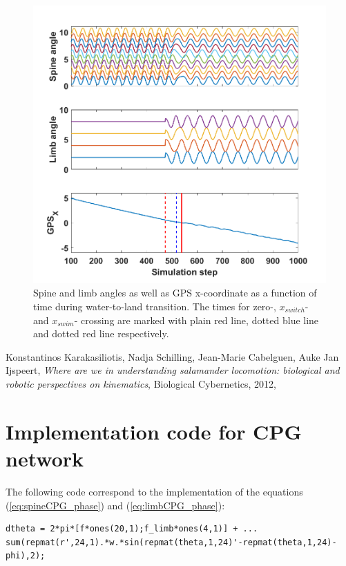 \documentclass[a4paper]{scrartcl}
\begin{document}
{\begin{figure}
	\centering
	\includegraphics[width=\linewidth]{Figures/water_land_angles.png}
	\caption{\label{fig:water_to_land}Spine and limb angles as well as GPS x-coordinate as a function of time during water-to-land transition. The times for zero-, $x_{switch}$- and $x_{swim}$- crossing are marked with plain red line, dotted blue line and dotted red line respectively.}
\end{figure} 


\begin{thebibliography}{9}

 Konstantinos Karakasiliotis, Nadja Schilling, Jean-Marie Cabelguen, Auke Jan Ijspeert, \textit{Where are we in understanding salamander locomotion: biological and robotic perspectives on kinematics}, Biological Cybernetics, 2012,  \label{ref:max_stride}

\end{thebibliography}


{\onecolumn
\appendix
\section{Implementation code for CPG network}\label{appedix:code_model}
The following code correspond to the implementation of the equations (\ref{eq:spineCPG_phase}) and (\ref{eq:limbCPG_phase}):
\begin{lstlisting}[style=Matlab-editor,basicstyle=\mlttfamily,numbers=none]
dtheta = 2*pi*[f*ones(20,1);f_limb*ones(4,1)] + ...
sum(repmat(r',24,1).*w.*sin(repmat(theta,1,24)'-repmat(theta,1,24)-phi),2);
\end{lstlisting} 

}}
\end{document}
